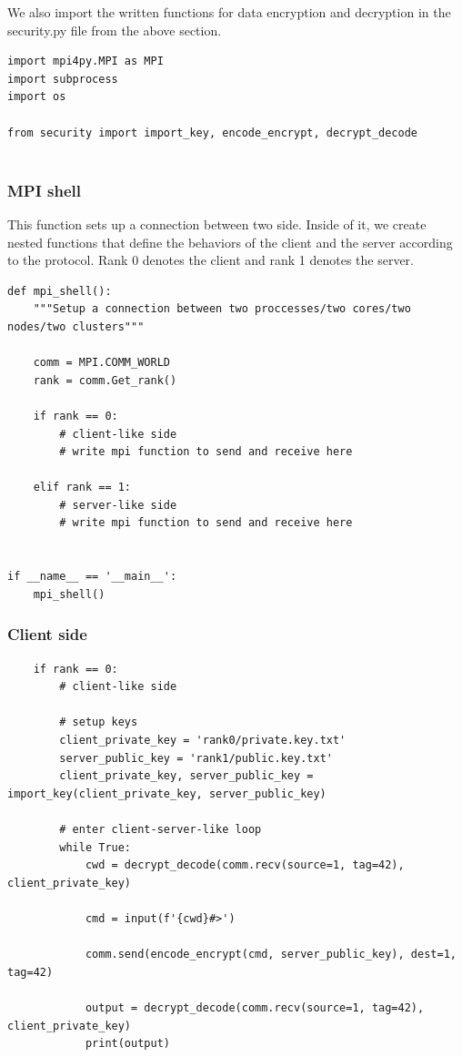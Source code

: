We also import the written functions for data encryption and decryption in the security.py file from the above section.

\begin{verbatim}
import mpi4py.MPI as MPI
import subprocess
import os

from security import import_key, encode_encrypt, decrypt_decode
   
\end{verbatim}

\subsubsection{MPI shell}

This function sets up a connection between two side. Inside of it, we create nested functions that define the behaviors of the client and the server according to the protocol. Rank 0 denotes the client and rank 1 denotes the server.

\begin{verbatim}
def mpi_shell():
    """Setup a connection between two proccesses/two cores/two nodes/two clusters"""

    comm = MPI.COMM_WORLD
    rank = comm.Get_rank()

    if rank == 0:
        # client-like side
        # write mpi function to send and receive here
        
    elif rank == 1:
        # server-like side
        # write mpi function to send and receive here


if __name__ == '__main__':
    mpi_shell()

\end{verbatim}

\subsubsection{Client side}

\begin{verbatim}
    if rank == 0:
        # client-like side

        # setup keys
        client_private_key = 'rank0/private.key.txt'
        server_public_key = 'rank1/public.key.txt'
        client_private_key, server_public_key = import_key(client_private_key, server_public_key)

        # enter client-server-like loop
        while True:
            cwd = decrypt_decode(comm.recv(source=1, tag=42), client_private_key)

            cmd = input(f'{cwd}#>')

            comm.send(encode_encrypt(cmd, server_public_key), dest=1, tag=42)

            output = decrypt_decode(comm.recv(source=1, tag=42), client_private_key)
            print(output)

\end{verbatim}

